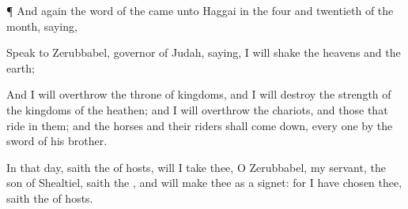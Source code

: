 {\par }{\PP {}¶ And
again the
word of the
{} came unto
Haggai in the
four and
twentieth
{} of the
month,
saying,

Speak to
Zerubbabel,
governor of
Judah,
saying, I will
shake the
heavens and the
earth;

And I will
overthrow the
throne of
kingdoms, and I will
destroy the
strength of the
kingdoms of the
heathen; and I will
overthrow the
chariots, and those that
ride in them; and the
horses and their
riders shall come
down, every
one by the
sword of his
brother.

In that
day,
saith the
{} of
hosts, will I
take thee, O
Zerubbabel, my
servant, the
son of
Shealtiel,
saith the
{}, and will
make thee as a
signet: for I have
chosen thee,
saith the
{} of
hosts.


\par }